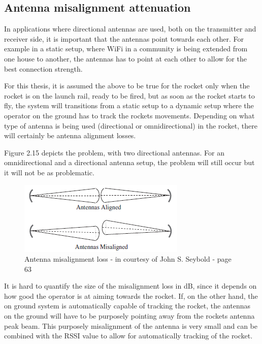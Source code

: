 \subsection{Antenna misalignment attenuation}
In applications where directional antennas are used, both on the transmitter and receiver side, it is important that the antennas point towards each other. For example in a static setup, where WiFi in a community is being extended from one house to another, the antennas has to point at each other to allow for the best connection strength.  

For this thesis, it is assumed the above to be true for the rocket only when the rocket is on the launch rail, ready to be fired, but as soon as the rocket starts to fly, the system will transitions from a static setup to a dynamic setup where the operator on the ground has to track the rockets movements. Depending on what type of antenna is being used (directional or omnidirectional) in the rocket, there will certainly be antenna alignment losses.

Figure 2.15 depicts the problem, with two directional antennas. For an omnidirectional and a directional antenna setup, the problem will still occur but it will not be as problematic. %

\begin{figure}[h]
\centering
\includegraphics[scale=1]{figures/AntennasAlignment.PNG}
\caption{Antenna misalignment loss - in courtesy of John S. Seybold  \cite{RFpropagation} - page 63}
\end{figure}

It is hard to  quantify the size of the misalignment loss in dB, since it depends on how good the operator is at aiming towards the rocket. If, on the other hand, the on ground system is automatically capable of tracking the rocket, the antennas on the ground will have to be purposely pointing away from the rockets antenna peak beam. This purposely misalignment of the antenna is very small and can be combined with the RSSI value to allow for automatically tracking of the rocket. %

